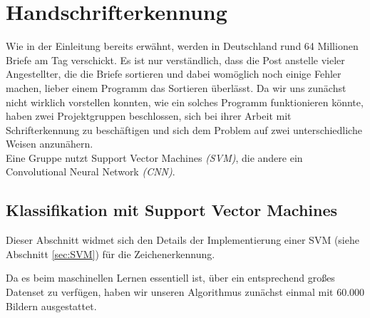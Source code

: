 \section{Handschrifterkennung}

Wie in der Einleitung bereits erwähnt, werden in Deutschland rund 64 Millionen Briefe am Tag verschickt. Es ist nur verständlich, dass die Post anstelle vieler Angestellter, die die Briefe sortieren und dabei womöglich noch einige Fehler machen, lieber einem Programm das Sortieren überlässt. Da wir uns zunächst nicht wirklich vorstellen konnten, wie ein solches Programm funktionieren könnte, haben zwei Projektgruppen beschlossen, sich bei ihrer Arbeit mit Schrifterkennung zu beschäftigen und sich dem Problem auf zwei unterschiedliche Weisen anzunähern.\\
Eine Gruppe nutzt Support Vector Machines \textit{(SVM)}, die andere ein Convolutional Neural Network \textit{(CNN)}.


\subsection{Klassifikation mit Support Vector Machines}

Dieser Abschnitt widmet sich den Details der Implementierung einer SVM (siehe Abschnitt \ref{sec:SVM}) f\"ur die Zeichenerkennung. 

Da es beim maschinellen Lernen essentiell ist, über ein entsprechend großes Datenset zu verfügen, haben wir unseren Algorithmus zunächst einmal mit 60.000 Bildern ausgestattet. 


